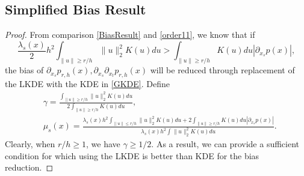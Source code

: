 \documentclass[aos,preprint]{imsart}
\theoremstyle{remark}
\begin{document}
\begin{appendix}
\subsection{Simplified Bias Result}
\begin{proof}\label{Simplified Bias Result}
From comparison \eqref{BiasResult} and \eqref{order11}, we know that if 
\[
\frac{\lambda_s(x)}{2} h^2 \int_{\|u\|\geq r /h} \|u\|_2^2 K(u) du >  \int_{\|u\|\geq r/h} K(u) du |\partial_{x_s} p(x)|,
\]
the bias of $\partial_{x_s} p_{r, h}(x), \partial_{x_s} \partial_{x_t} p_{r, h}(x)$ will be reduced through replacement of the LKDE with the KDE in \eqref{GKDE}.
Define
\[
\begin{aligned}
&\gamma = \frac{\int_{\|u\|\geq r/h } \|u\|_2^2 K(u) du}{ 2\int_{\|u\|\geq r/h} K(u) du },\\
&\mu_s(x) = \frac{\lambda_s(x) h^2 \int_{\|u\|\leq r /h} \|u\|_2^2 K(u) du +  2\int_{\|u\|\geq r/h} K(u) du |\partial_{x_s} p(x)|}{\lambda_s(x) h^2 \int\|u\|_2^2 K(u) du }.
\end{aligned}
\]
Clearly, when $r/h \geq 1$, we have $\gamma\geq 1/2$. As a result, we can provide a sufficient condition for which using the LKDE is better than KDE for the bias reduction. 
\end{proof}

\end{appendix}
\end{document}
